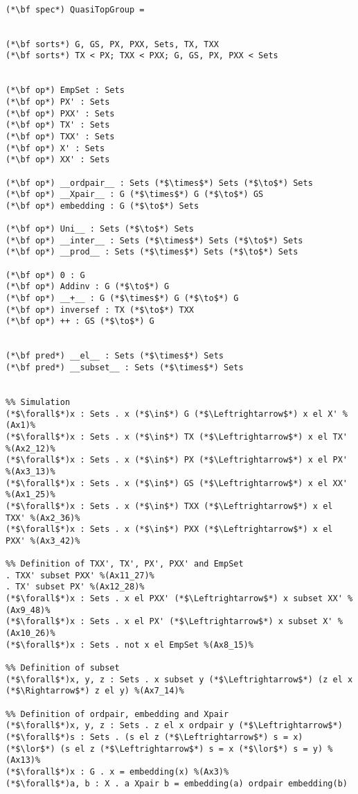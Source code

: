 \documentclass[preview]{standalone}
\begin{document}
\begin{lstlisting}

(*\bf spec*) QuasiTopGroup =


(*\bf sorts*) G, GS, PX, PXX, Sets, TX, TXX
(*\bf sorts*) TX < PX; TXX < PXX; G, GS, PX, PXX < Sets


(*\bf op*) EmpSet : Sets
(*\bf op*) PX' : Sets
(*\bf op*) PXX' : Sets
(*\bf op*) TX' : Sets
(*\bf op*) TXX' : Sets
(*\bf op*) X' : Sets
(*\bf op*) XX' : Sets

(*\bf op*) __ordpair__ : Sets (*$\times$*) Sets (*$\to$*) Sets
(*\bf op*) __Xpair__ : G (*$\times$*) G (*$\to$*) GS
(*\bf op*) embedding : G (*$\to$*) Sets

(*\bf op*) Uni__ : Sets (*$\to$*) Sets
(*\bf op*) __inter__ : Sets (*$\times$*) Sets (*$\to$*) Sets
(*\bf op*) __prod__ : Sets (*$\times$*) Sets (*$\to$*) Sets

(*\bf op*) 0 : G
(*\bf op*) Addinv : G (*$\to$*) G
(*\bf op*) __+__ : G (*$\times$*) G (*$\to$*) G
(*\bf op*) inversef : TX (*$\to$*) TXX
(*\bf op*) ++ : GS (*$\to$*) G


(*\bf pred*) __el__ : Sets (*$\times$*) Sets
(*\bf pred*) __subset__ : Sets (*$\times$*) Sets


%% Simulation
(*$\forall$*)x : Sets . x (*$\in$*) G (*$\Leftrightarrow$*) x el X' %(Ax1)%
(*$\forall$*)x : Sets . x (*$\in$*) TX (*$\Leftrightarrow$*) x el TX' %(Ax2_12)%
(*$\forall$*)x : Sets . x (*$\in$*) PX (*$\Leftrightarrow$*) x el PX' %(Ax3_13)%
(*$\forall$*)x : Sets . x (*$\in$*) GS (*$\Leftrightarrow$*) x el XX' %(Ax1_25)%
(*$\forall$*)x : Sets . x (*$\in$*) TXX (*$\Leftrightarrow$*) x el TXX' %(Ax2_36)%
(*$\forall$*)x : Sets . x (*$\in$*) PXX (*$\Leftrightarrow$*) x el PXX' %(Ax3_42)%

%% Definition of TXX', TX', PX', PXX' and EmpSet
. TXX' subset PXX' %(Ax11_27)%
. TX' subset PX' %(Ax12_28)%
(*$\forall$*)x : Sets . x el PXX' (*$\Leftrightarrow$*) x subset XX' %(Ax9_48)%
(*$\forall$*)x : Sets . x el PX' (*$\Leftrightarrow$*) x subset X' %(Ax10_26)%
(*$\forall$*)x : Sets . not x el EmpSet %(Ax8_15)%

%% Definition of subset
(*$\forall$*)x, y, z : Sets . x subset y (*$\Leftrightarrow$*) (z el x (*$\Rightarrow$*) z el y) %(Ax7_14)%

%% Definition of ordpair, embedding and Xpair
(*$\forall$*)x, y, z : Sets . z el x ordpair y (*$\Leftrightarrow$*) (*$\forall$*)s : Sets . (s el z (*$\Leftrightarrow$*) s = x) (*$\lor$*) (s el z (*$\Leftrightarrow$*) s = x (*$\lor$*) s = y) %(Ax13)%
(*$\forall$*)x : G . x = embedding(x) %(Ax3)%
(*$\forall$*)a, b : X . a Xpair b = embedding(a) ordpair embedding(b)


\end{lstlisting}
\end{document}

